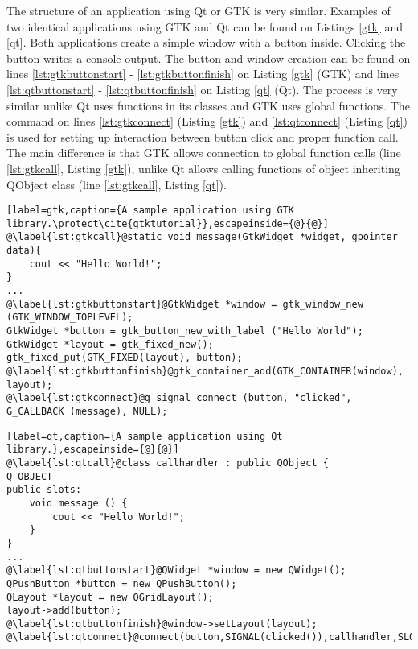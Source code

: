 The structure of an application using Qt or GTK is very similar. Examples of two identical applications using GTK and Qt can be found on Listings \ref{gtk} and \ref{qt}. Both applications create a simple window with a button inside. Clicking the button writes a console output. The button and window creation can be found on lines \ref{lst:gtkbuttonstart} - \ref{lst:gtkbuttonfinish} on Listing \ref{gtk} (GTK) and lines \ref{lst:qtbuttonstart} - \ref{lst:qtbuttonfinish} on Listing \ref{qt} (Qt). The process is very similar unlike Qt uses functions in its classes and GTK uses global functions. The command on lines \ref{lst:gtkconnect} (Listing \ref{gtk}) and \ref{lst:qtconnect} (Listing \ref{qt}) is used for setting up interaction between button click and proper function call. The main difference is that GTK allows connection to global function calls (line \ref{lst:gtkcall}, Listing \ref{gtk}), unlike Qt allows calling functions of object inheriting QObject class (line \ref{lst:gtkcall}, Listing \ref{qt}).

\begin{lstlisting}[label=gtk,caption={A sample application using GTK library.\protect\cite{gtktutorial}},escapeinside={@}{@}]
@\label{lst:gtkcall}@static void message(GtkWidget *widget, gpointer data){
    cout << "Hello World!";
}
...
@\label{lst:gtkbuttonstart}@GtkWidget *window = gtk_window_new (GTK_WINDOW_TOPLEVEL);
GtkWidget *button = gtk_button_new_with_label ("Hello World");
GtkWidget *layout = gtk_fixed_new();
gtk_fixed_put(GTK_FIXED(layout), button);
@\label{lst:gtkbuttonfinish}@gtk_container_add(GTK_CONTAINER(window), layout);
@\label{lst:gtkconnect}@g_signal_connect (button, "clicked", G_CALLBACK (message), NULL);
\end{lstlisting}

\begin{lstlisting}[label=qt,caption={A sample application using Qt library.},escapeinside={@}{@}]
@\label{lst:qtcall}@class callhandler : public QObject {
Q_OBJECT
public slots:
	void message () {
		cout << "Hello World!";
	}
}
...
@\label{lst:qtbuttonstart}@QWidget *window = new QWidget();
QPushButton *button = new QPushButton();
QLayout *layout = new QGridLayout();
layout->add(button);
@\label{lst:qtbuttonfinish}@window->setLayout(layout);
@\label{lst:qtconnect}@connect(button,SIGNAL(clicked()),callhandler,SLOT(message()));
\end{lstlisting}